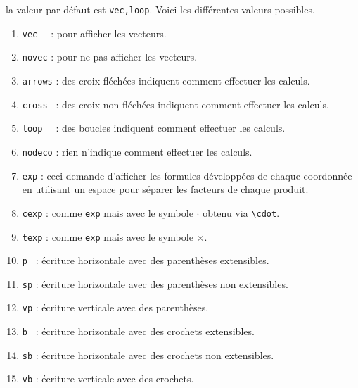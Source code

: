 \documentclass[12pt,a4paper]{article}
\theoremstyle{definition}
\newcommand\env[1]{\texttt{#1}}
\newcommand\macro[1]{\env{\textbackslash{}#1}}
\begin{document}
\IDoption{} la valeur par défaut est \verb+vec,loop+. 
            Voici les différentes valeurs possibles.
\begin{enumerate}
	\item \verb+vec  + : pour afficher les vecteurs.

	\item \verb+novec+ : pour ne pas afficher les vecteurs.

	\medskip
	
	\item \verb+arrows+ : des croix fléchées indiquent comment effectuer les calculs.

	\item \verb+cross + : des croix non fléchées indiquent comment effectuer les calculs.

	\item \verb+loop  + : des boucles indiquent comment effectuer les calculs.

	\item \verb+nodeco+ : rien n'indique comment effectuer les calculs.

    \medskip

    \item \verb+exp+ : ceci demande d'afficher les formules développées de chaque coordonnée en utilisant un espace pour séparer les facteurs de chaque produit.

    \item \verb+cexp+ : comme \verb+exp+ mais avec le symbole $\cdot$ obtenu via \macro{cdot}.

    \item \verb+texp+ : comme \verb+exp+ mais avec le symbole $\times$.

	\medskip
	
	\item \verb+p + : écriture horizontale avec des parenthèses extensibles.

	\item \verb+sp+ : écriture horizontale avec des parenthèses non extensibles.

	\item \verb+vp+ : écriture verticale avec des parenthèses.

	\medskip
	
	\item \verb+b + : écriture horizontale avec des crochets extensibles.

	\item \verb+sb+ : écriture horizontale avec des crochets non extensibles.

	\item \verb+vb+ : écriture verticale avec des crochets.
\end{enumerate}
\end{document}

